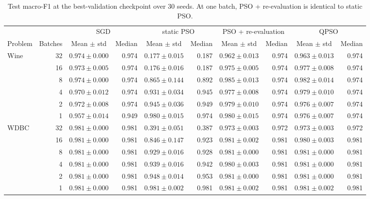\begin{table}[t]
\centering
\caption{Test macro-F1 at the best-validation checkpoint over 30 seeds. At one batch, PSO + re-evaluation is identical to static PSO.}
\label{tab:test_f1}
\begin{tabular}{lrcrcrcrcr}
\toprule
 & & \multicolumn{2}{c}{SGD} & \multicolumn{2}{c}{static PSO} & \multicolumn{2}{c}{PSO + re-evaluation} & \multicolumn{2}{c}{QPSO} \\
\cmidrule(lr){3-4} \cmidrule(lr){5-6} \cmidrule(lr){7-8} \cmidrule(lr){9-10}
Problem & Batches & Mean $\pm$ std & Median & Mean $\pm$ std & Median & Mean $\pm$ std & Median & Mean $\pm$ std & Median \\
\midrule
Wine & 32 & $0.974 \pm 0.000$ & 0.974 & $0.177 \pm 0.015$ & 0.187 & $0.962 \pm 0.013$ & 0.974 & $0.963 \pm 0.013$ & 0.974 \\
 & 16 & $0.973 \pm 0.005$ & 0.974 & $0.176 \pm 0.016$ & 0.187 & $0.975 \pm 0.005$ & 0.974 & $0.977 \pm 0.008$ & 0.974 \\
 & 8 & $0.974 \pm 0.000$ & 0.974 & $0.865 \pm 0.144$ & 0.892 & $0.985 \pm 0.013$ & 0.974 & $0.982 \pm 0.014$ & 0.974 \\
 & 4 & $0.970 \pm 0.012$ & 0.974 & $0.931 \pm 0.034$ & 0.945 & $0.977 \pm 0.008$ & 0.974 & $0.979 \pm 0.010$ & 0.974 \\
 & 2 & $0.972 \pm 0.008$ & 0.974 & $0.945 \pm 0.036$ & 0.949 & $0.979 \pm 0.010$ & 0.974 & $0.976 \pm 0.007$ & 0.974 \\
 & 1 & $0.957 \pm 0.014$ & 0.949 & $0.980 \pm 0.015$ & 0.974 & $0.980 \pm 0.015$ & 0.974 & $0.976 \pm 0.007$ & 0.974 \\
\midrule
WDBC & 32 & $0.981 \pm 0.000$ & 0.981 & $0.391 \pm 0.051$ & 0.387 & $0.973 \pm 0.003$ & 0.972 & $0.973 \pm 0.003$ & 0.972 \\
 & 16 & $0.981 \pm 0.000$ & 0.981 & $0.846 \pm 0.147$ & 0.923 & $0.981 \pm 0.002$ & 0.981 & $0.980 \pm 0.003$ & 0.981 \\
 & 8 & $0.981 \pm 0.000$ & 0.981 & $0.929 \pm 0.016$ & 0.928 & $0.981 \pm 0.000$ & 0.981 & $0.981 \pm 0.000$ & 0.981 \\
 & 4 & $0.981 \pm 0.000$ & 0.981 & $0.939 \pm 0.016$ & 0.942 & $0.980 \pm 0.003$ & 0.981 & $0.981 \pm 0.000$ & 0.981 \\
 & 2 & $0.981 \pm 0.000$ & 0.981 & $0.948 \pm 0.014$ & 0.953 & $0.981 \pm 0.000$ & 0.981 & $0.981 \pm 0.000$ & 0.981 \\
 & 1 & $0.981 \pm 0.000$ & 0.981 & $0.981 \pm 0.002$ & 0.981 & $0.981 \pm 0.002$ & 0.981 & $0.981 \pm 0.002$ & 0.981 \\

\end{tabular}
\end{table}
